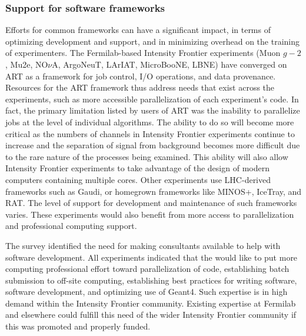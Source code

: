 \subsubsection{Support for software frameworks}
Efforts for common frameworks can have a significant impact, in terms of optimizing  development and support, and in
minimizing overhead on the training of experimenters.  The Fermilab-based Intensity Frontier
experiments (Muon $g-2$, Mu2e, NO$\nu$A, ArgoNeuT, LArIAT, MicroBooNE, LBNE) have
converged on ART as a framework for job control, I/O operations, and data provenance. 
Resources for the ART framework thus address needs that
exist across the experiments, such as more accessible parallelization of each
experiment's code. In fact, the primary limitation listed by users of ART was
the inability to parallelize jobs at the level of individual algorithms.  The
ability to do so will become more critical as the numbers of channels in Intensity Frontier
experiments continue to increase and the separation of signal from background
becomes more difficult due to the rare nature of the processes being examined.
This ability will also allow Intensity Frontier experiments to take advantage of the design of
modern computers containing multiple cores. Other experiments use LHC-derived
frameworks such as Gaudi, or homegrown frameworks like MINOS+, IceTray, and
RAT. The level of support for development and maintenance of such frameworks
varies. These experiments would also benefit from more access to
parallelization and professional computing support.

The survey identified the need for making consultants available to help with
software development. All experiments indicated that the would like to
put more computing professional effort toward parallelization of code,
establishing batch submission to off-site computing, establishing best
practices for writing software, software development, and  optimizing use of
Geant4. Such expertise is in high demand within the Intensity Frontier community. Existing expertise 
at Fermilab and elsewhere could fulfill this need of the
wider Intensity Frontier community if this was promoted and properly funded.

